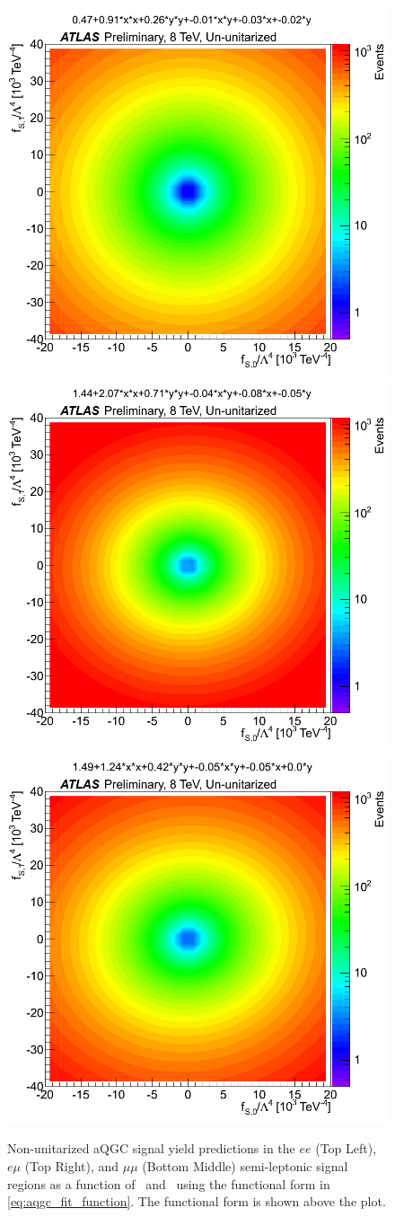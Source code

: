 %

\begin{figure}[tb]
\centering
\includegraphics[width=.495\textwidth]{figures/aqgc_fits/ee/2l2jUnUnit_ee.png}
\includegraphics[width=.495\textwidth]{figures/aqgc_fits/emu/2l2jUnUnit_emu.png}
\includegraphics[width=.495\textwidth]{figures/aqgc_fits/mumu/2l2jUnUnit_mumu.png}
\caption{Non-unitarized aQGC signal yield predictions in the $ee$ (Top Left), 
$e\mu$ (Top Right), and $\mu\mu$ (Bottom Middle) semi-leptonic signal regions
as a function of \fszero~and \fsone~using the functional
form in \eqn\eqref{eq:aqgc_fit_function}. The functional form is shown
above the plot.}
\label{fig:aqgc_fit_2l2j_ununit}
\end{figure}

